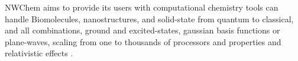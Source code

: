 NWChem aims to provide its users with computational chemistry tools can handle Biomolecules, nanostructures, and solid-state from quantum to classical, and all combinations, ground and excited-states, gaussian basis functions or plane-waves, scaling from one to thousands of processors and properties and relativistic effects \cite{Valiev_2010}.